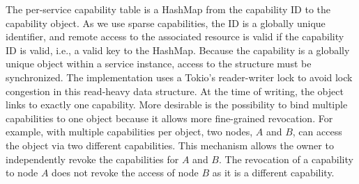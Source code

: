 The per-service capability table is a HashMap from the capability ID to the capability object. As we use sparse capabilities, the ID is a globally unique identifier, and remote access to the associated resource is valid if the capability ID is valid, i.e., a valid key to the HashMap. Because the capability is a globally unique object within a service instance, access to the structure must be synchronized. The implementation uses a Tokio's reader-writer lock to avoid lock congestion in this read-heavy data structure.
%
%
%
%
%
At the time of writing, the object links to exactly one capability. More desirable is the possibility to bind multiple capabilities to one object because it allows more fine-grained revocation. For example, with multiple capabilities per object, two nodes, $A$ and $B$, can access the object via two different capabilities. This mechanism allows the owner to independently revoke the capabilities for $A$ and $B$. The revocation of a capability to node $A$ does not revoke the access of node $B$ as it is a different capability.


